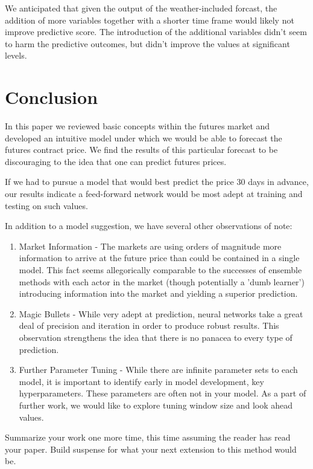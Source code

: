 \documentclass[twoside,11pt]{article}
\begin{document}
We anticipated that given the output of the weather-included forcast, the addition of more variables together with a shorter time frame would likely not improve predictive score. The introduction of the additional variables didn't seem to harm the predictive outcomes, but didn't improve the values at significant levels. 

\section{Conclusion}

In this paper we reviewed basic concepts within the futures market and developed an intuitive model under which we would be able to forecast the futures contract price. We find the results of this particular forecast to be discouraging to the idea that one can predict futures prices. 

If we had to pursue a model that would best predict the price 30 days in advance, our results indicate a feed-forward network would be most adept at training and testing on such values. 

In addition to a model suggestion, we have several other observations of note:

\begin{enumerate}
	\item Market Information - The markets are using orders of magnitude more information to arrive at the future price than could be contained in a single model. This fact seems allegorically comparable to the successes of ensemble methods with each actor in the market (though potentially a 'dumb learner') introducing information into the market and yielding a superior prediction. 
	\item Magic Bullets - While very adept at prediction, neural networks take a great deal of precision and iteration in order to produce robust results. This observation strengthens the idea that there is no panacea to every type of prediction.
	\item Further Parameter Tuning - While there are infinite parameter sets to each model, it is important to identify early in model development, key hyperparameters. These parameters are often not in your model.  As a part of further work, we would like to explore tuning window size and look ahead values. 
\end{enumerate}



Summarize your work one more time, this time assuming the reader has read your paper.
Build suspense for what your next extension to this method would be.
\end{document}

